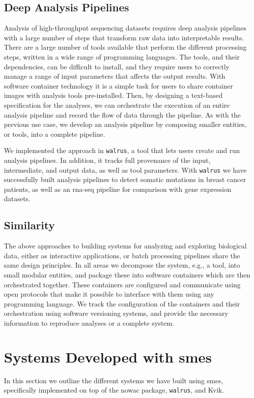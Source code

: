 \subsection{Deep Analysis Pipelines} 
Analysis of high-throughput sequencing datasets requires deep analysis pipelines
with a large number of steps that transform raw data into interpretable
results.\cite{diao2015building} There are a large number of tools available that
perform the different processing steps, written in a wide range of programming
languages. The tools, and their dependencies, can be difficult to install, and
they require users to correctly manage a range of input parameters that affects
the output results. With software container technology it is a simple task for
users to share container images with analysis tools pre-installed. Then, by
designing a text-based specification for the analyses, we can orchestrate the
execution of an entire analysis pipeline and record the flow of data through the
pipeline. As with the previous use case, we develop an analysis pipeline by
composing smaller entities, or tools, into a complete pipeline. 

We implemented the approach in \texttt{walrus}, a tool that lets users create
and run analysis pipelines. In addition, it tracks full provenance of the input,
intermediate, and output data, as well as tool parameters. With \texttt{walrus}
we have successfully built analysis pipelines to detect somatic mutations in
breast cancer patients, as well as an \gls{rna}-seq pipeline for comparison with
gene expression datasets. 

\subsection{Similarity} 
The above approaches to building systems for analyzing and exploring biological
data, either as interactive applications, or batch processing pipelines share
the same design principles. In all areas we decompose the system, e.g., a tool,
into small modular entities, and package these into software containers which
are then orchestrated together. These containers are configured and communicate
using open protocols that make it possible to interface with them using any
programming language. We track the configuration of the containers and their
orchestration using software versioning systems, and provide the necessary
information to reproduce analyses or a complete system. 

\section{Systems Developed with \glspl{sme}}
In this section we outline the different systems we have built using \glspl{sme},
specifically implemented on top of the \gls{nowac} package, \texttt{walrus}, and
Kvik. 


